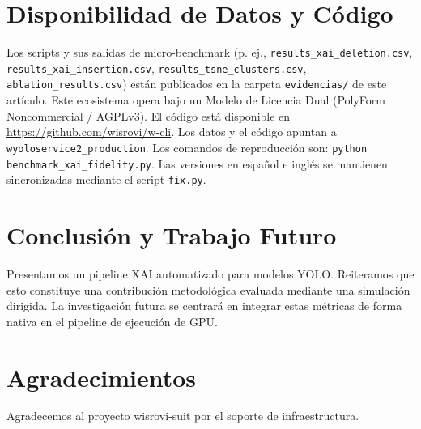 \documentclass[conference]{IEEEtran}
\begin{document}
\section{Disponibilidad de Datos y Código}
Los scripts y sus salidas de micro-benchmark (p. ej., \texttt{results\_xai\_deletion.csv}, \texttt{results\_xai\_insertion.csv}, \texttt{results\_tsne\_clusters.csv}, \texttt{ablation\_results.csv}) están publicados en la carpeta \texttt{evidencias/} de este artículo. Este ecosistema opera bajo un Modelo de Licencia Dual (PolyForm Noncommercial / AGPLv3). El código está disponible en \url{https://github.com/wisrovi/w-cli}. Los datos y el código apuntan a \texttt{wyoloservice2\_production}. Los comandos de reproducción son: \texttt{python benchmark\_xai\_fidelity.py}. Las versiones en español e inglés se mantienen sincronizadas mediante el script \texttt{fix.py}.

\section{Conclusión y Trabajo Futuro}
Presentamos un pipeline XAI automatizado para modelos YOLO. Reiteramos que esto constituye una contribución metodológica evaluada mediante una simulación dirigida. La investigación futura se centrará en integrar estas métricas de forma nativa en el pipeline de ejecución de GPU.

\section*{Agradecimientos}
Agradecemos al proyecto wisrovi-suit por el soporte de infraestructura.



\end{document}
